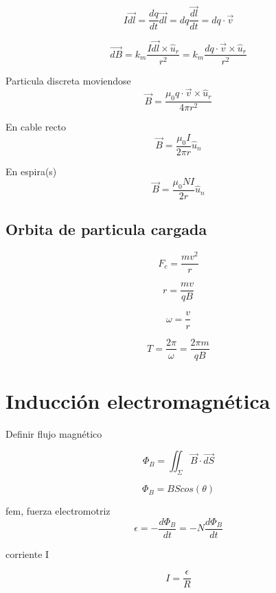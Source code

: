 \documentclass[12pt, letterpaper, twoside]{article}
\begin{document}
	\begin{equation}
		I \vec{dl} = \dfrac{dq}{dt} \vec{dl} = dq \dfrac{\vec{dl}}{dt} = dq \cdot \vec{v}
	\end{equation}
	
	\begin{equation}
		\vec{dB} = k_m \frac{I\vec{dl} \times \hat{u}_r}{r^2} = k_m \frac{dq \cdot \vec{v} \times \hat{u}_r}{r^2}
	\end{equation}
	
	Particula discreta moviendose
	\begin{equation}
		\vec{B} = \frac{\mu_0 q \cdot \vec{v} \times \hat{u}_r}{4 \pi r^2} 
	\end{equation}
	
	
	En cable recto
	\begin{equation}
		\vec{B} = \frac{\mu_0I}{2 \pi r} \hat{u}_n
	\end{equation}
	
	En espira(s)
	\begin{equation}
		\vec{B} = \frac{\mu_0NI}{2 r} \hat{u}_n
	\end{equation}

	\subsection{Orbita de particula cargada}

	\begin{equation}
		F_c = \frac{mv^2}{r}
	\end{equation}

	\begin{equation}
		r = \frac{mv}{qB}
	\end{equation}

	\begin{equation}
		\omega = \frac{v}{r}
	\end{equation}

	\begin{equation}
		T = \frac{2 \pi}{\omega} = \frac{2 \pi m}{qB}
	\end{equation}
	
	\section{Inducción electromagnética}

	Definir flujo magnético

	\begin{equation}
		\Phi_B = \iint_\Sigma \vec{B} \cdot \vec{dS}
	\end{equation}

	\begin{equation}
		\Phi_B = B S cos(\theta)
	\end{equation}

	fem, fuerza electromotriz
	\begin{equation}
		\epsilon = -\dfrac{d\Phi_B}{dt} = -N \dfrac{d\Phi_B}{dt}
	\end{equation}
	
	corriente I
	
	\begin{equation}
		I = \frac{\epsilon}{R}
	\end{equation}
	
\end{document}
